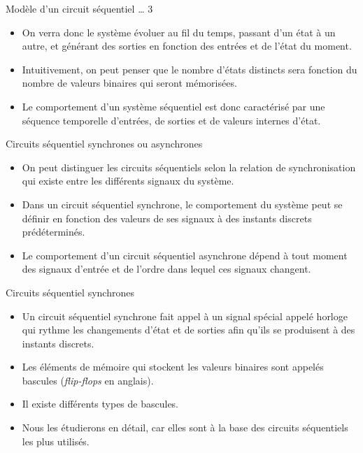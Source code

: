 \documentclass[presentation]{beamer}
\begin{document}
\begin{frame}[label={sec:org1f616d7}]{Modèle d'un circuit séquentiel \ldots{} 3}
\begin{itemize}
\item On verra donc le système évoluer au fil du temps, passant d'un état à un autre, et générant des sorties en fonction des entrées et de l'état du moment.

\item Intuitivement, on peut penser que le nombre d'états distincts sera fonction du nombre de valeurs binaires qui seront mémorisées.

\item Le comportement d'un système séquentiel est donc caractérisé par une séquence temporelle d'entrées, de sorties et de valeurs internes d'état.
\end{itemize}
\end{frame}

\begin{frame}[label={sec:orgba50542}]{Circuits séquentiel synchrones ou asynchrones}
\begin{itemize}
\item On peut distinguer les circuits séquentiels selon la relation de synchronisation qui existe entre les différents signaux du système.

\item Dans un circuit séquentiel \alert{synchrone}, le comportement du système peut se définir en fonction des valeurs de ses signaux à des instants discrets prédéterminés.

\item Le comportement d'un circuit séquentiel \alert{asynchrone} dépend à tout moment des signaux d'entrée et de l'ordre dans lequel ces signaux changent.
\end{itemize}
\end{frame}

\begin{frame}[label={sec:org0615a64}]{Circuits séquentiel synchrones}
\begin{itemize}
\item Un circuit séquentiel synchrone fait appel à un signal spécial appelé \alert{horloge} qui rythme les changements d'état et de sorties afin qu'ils se produisent à des instants discrets.

\item Les éléments de mémoire qui stockent les valeurs binaires sont appelés \alert{bascules} (\emph{flip-flops} en anglais).

\item Il existe différents types de bascules.

\item Nous les étudierons en détail, car elles sont à la base des circuits séquentiels les plus utilisés.
\end{itemize}
\end{frame}
\end{document}
